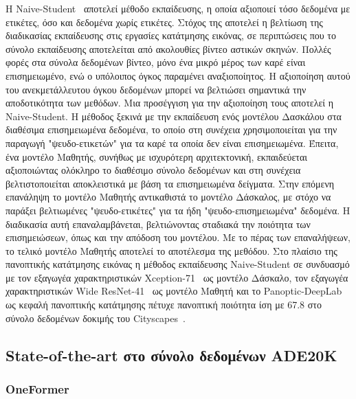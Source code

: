 \documentclass[12pt]{article}
\numberwithin{equation}{section}
\begin{document}
H Naive-Student~\cite{chen2020naivestudentleveragingsemisupervisedlearning} αποτελεί μέθοδο εκπαίδευσης, η οποία αξιοποιεί τόσο δεδομένα με ετικέτες, όσο και δεδομένα χωρίς ετικέτες. Στόχος της αποτελεί η βελτίωση της διαδικασίας εκπαίδευσης στις εργασίες κατάτμησης εικόνας, σε περιπτώσεις που το σύνολο εκπαίδευσης αποτελείται από ακολουθίες βίντεο αστικών σκηνών. Πολλές φορές στα σύνολα δεδομένων βίντεο, μόνο ένα μικρό μέρος των καρέ είναι επισημειωμένο, ενώ ο υπόλοιπος όγκος παραμένει αναξιοποίητος. Η αξιοποίηση αυτού του ανεκμετάλλευτου όγκου δεδομένων μπορεί να βελτιώσει σημαντικά την αποδοτικότητα των μεθόδων. Μια προσέγγιση για την αξιοποίηση τους αποτελεί η Naive-Student. Η μέθοδος ξεκινά με την εκπαίδευση ενός μοντέλου Δασκάλου στα διαθέσιμα επισημειωμένα δεδομένα, το οποίο στη συνέχεια χρησιμοποιείται για την παραγωγή "ψευδο-ετικετών" για τα καρέ τα οποία δεν είναι επισημειωμένα. Έπειτα, ένα μοντέλο Μαθητής, συνήθως με ισχυρότερη αρχιτεκτονική, εκπαιδεύεται αξιοποιώντας ολόκληρο το διαθέσιμο σύνολο δεδομένων και στη συνέχεια βελτιστοποιείται αποκλειστικά με βάση τα επισημειωμένα δείγματα. Στην επόμενη επανάληψη το μοντέλο Μαθητής αντικαθιστά το μοντέλο Δάσκαλος, με στόχο να παράξει βελτιωμένες "ψευδο-ετικέτες" για τα ήδη "ψευδο-επισημειωμένα" δεδομένα. Η διαδικασία αυτή επαναλαμβάνεται, βελτιώνοντας σταδιακά την ποιότητα των επισημειώσεων, όπως και την απόδοση του μοντέλου. Με το πέρας των επαναλήψεων, το τελικό μοντέλο Μαθητής αποτελεί το αποτέλεσμα της μεθόδου. Στο πλαίσιο της πανοπτικής κατάτμησης εικόνας η μέθοδος εκπαίδευσης Naive-Student σε συνδυασμό με τον εξαγωγέα χαρακτηριστικών Xception-71~\cite{chollet2017xceptiondeeplearningdepthwise} ως μοντέλο Δάσκαλο, τον εξαγωγέα χαρακτηριστικών Wide ResNet-41~\cite{chen2021scalingwideresidualnetworks} ως μοντέλο Μαθητή και το Panoptic-DeepLab~\cite{cheng2020panopticdeeplabsimplestrongfast} ως κεφαλή πανοπτικής κατάτμησης πέτυχε πανοπτική ποιότητα ίση με 67.8 στο σύνολο δεδομένων δοκιμής του Cityscapes~\cite{DBLP:journals/corr/CordtsORREBFRS16}.\\

\subsection{State-of-the-art στο σύνολο δεδομένων ADE20K}

\subsubsection{OneFormer}
\end{document}
